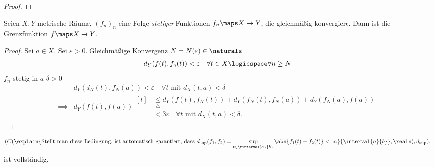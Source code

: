 \begin{lemma}
\begin{eigenschaftenenumerate}
\begin{proof}
            
        \end{proof}
        \item \label{gleichmaessige_konvergenz_stetigkeit}Seien \( X,Y\) metrische Räume, \( (f_n)_n\) eine Folge \emph{stetiger} Funktionen \( f_n\maps X\to Y\), die gleichmäßig konvergiere. Dann ist die Grenzfunktion \( f\maps X\to Y\).
        \begin{proof}
            Sei \( a\in X\). Sei \( \varepsilon>0 \). Gleichmäßige Konvergenz \timplies \texists \( N=N(\varepsilon)\in \naturals \) \sd 
            \begin{align*}
                d_Y(f(t),f_n(t))<\varepsilon\quad \forall t\in X\logicspace \forall n\geq N
            \end{align*} 
            \( f_n\) stetig in \( a\) \timplies \texists \( \delta > 0 \) \sd
            \begin{align*}
                &d_Y(d_N(t),f_N(a))<\varepsilon\quad \forall t\text{ mit } d_X(t,a)<\delta\\
                \implies &d_Y(f(t),f(a))\begin{aligned}[t]
                    &\underset{\triangle}{\leq}d_Y(f(t),f_N(t))+d_Y(f_N(t),f_N(a))+d_Y(f_N(a),f(a))\\
                    &<3\varepsilon\quad \forall t\text{ mit }d_X(t,a)<\delta.
                \end{aligned}
            \end{align*}
            
        \end{proof}
         
    \end{eigenschaftenenumerate}
        
\end{lemma}
\begin{folgerung*}
    \begin{align*}
        (C(\explain{\text{Stellt man diese Bedingung, ist automatisch garantiert, dass \( d_{\sup}(f_1,f_2)=\sup_{t\in \rinterval{a}{b}}\abs{f_1(t)-f_2(t)}<\infty \)}}{\interval{a}{b}},\reals),d_{\sup}),
    \end{align*} ist vollständig.  
\end{folgerung*}
